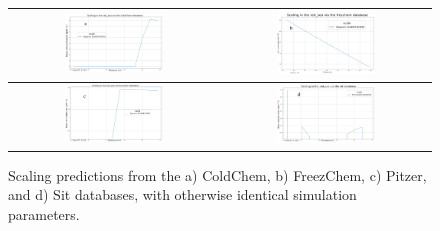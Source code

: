 \begin{figure}[h]
    \centering
    \begin{tabular}{c|c}
        \includegraphics[width=0.49\textwidth]{images/ROSSpy/sensitivity_analyses/databases/ColdChem.png} 
        & \includegraphics[width=0.49\textwidth]{images/ROSSpy/sensitivity_analyses/databases/FreezChem.png} \\ \midrule 
        \includegraphics[width=0.49\textwidth]{images/ROSSpy/sensitivity_analyses/databases/Pitzer.png} 
        & \includegraphics[width=0.49\textwidth]{images/ROSSpy/sensitivity_analyses/databases/Sit.png} 
        \\ \bottomrule
    \end{tabular}
    \caption{
        Scaling predictions from the a) ColdChem, b) FreezChem, c) Pitzer, and d) Sit databases, with otherwise identical simulation parameters.
    }
    \label{database_selection}
\end{figure}

